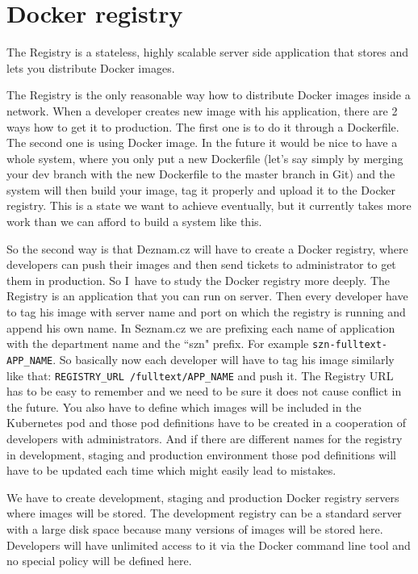 \chapter{Docker registry}

The Registry is a stateless, highly scalable server side application that stores and lets you distribute Docker images. \cite{docker-registry}

The Registry is the only reasonable way how to distribute Docker images inside a network. When a developer creates new image with his application, there are 2 ways how to get it to production. The first one is to do it through a Dockerfile. The second one is using Docker image. In the future it would be nice to have a whole system, where you only put a new Dockerfile (let’s say simply by merging your dev branch with the new Dockerfile to the master branch in Git) and the system will then build your image, tag it properly and upload it to the Docker registry. This is a state we want to achieve eventually, but it currently takes more work than we can afford to build a system like this.

So the second way is that Deznam.cz will have to create a Docker registry, where developers can push their images and then send tickets to administrator to get them in production. So I~have to study the Docker registry more deeply. The Registry is an application that you can run on server. Then every developer have to tag his image with server name and port on which the registry is running and append his own name. In Seznam.cz we are prefixing each name of application with the department name and the ``szn" prefix. For example \lstinline{szn-fulltext-APP_NAME}. So basically now each developer will have to tag his image similarly like that: \lstinline{REGISTRY_URL /fulltext/APP_NAME} and push it. The Registry URL has to be easy to remember and we need to be sure it does not cause conflict in the future. You also have to define which images will be included in the Kubernetes pod and those pod definitions have to be created in a cooperation of developers with administrators. And if there are different names for the registry in development, staging and production environment those pod definitions will have to be updated each time which might easily lead to mistakes.

We have to create development, staging and production Docker registry servers where images will be stored. The development registry can be a standard server with a large disk space because many versions of images will be stored here. Developers will have unlimited access to it via the Docker command line tool and no special policy will be defined here.

